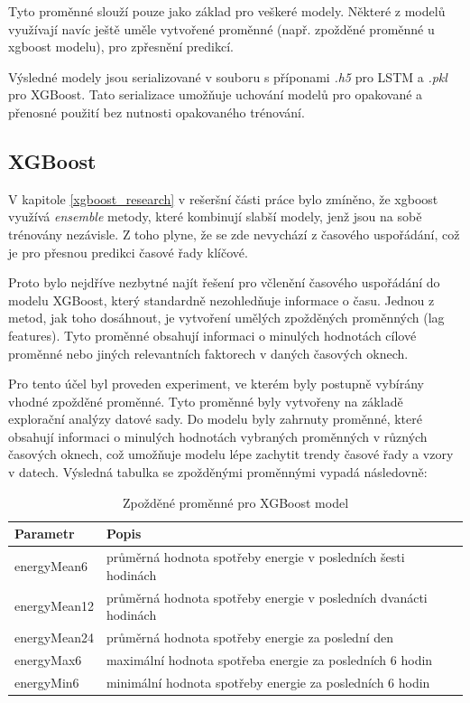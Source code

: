 \documentclass[FM,BP,fonts]{tulthesis}
\begin{document}
Tyto proměnné slouží pouze jako základ pro veškeré modely. Některé z modelů využívají navíc ještě uměle vytvořené proměnné (např. zpožděné proměnné u xgboost modelu), pro zpřesnění predikcí.

Výsledné modely jsou serializované v souboru s příponami \textit{.h5} pro LSTM a \textit{.pkl} pro XGBoost. Tato serializace umožňuje uchování modelů pro opakované a přenosné použití bez nutnosti opakovaného trénování.

\subsection{XGBoost}
V kapitole \ref{xgboost_research} v rešeršní části práce bylo zmíněno, že xgboost využívá \textit{ensemble} metody, které kombinují slabší modely, jenž jsou na sobě trénovány nezávisle. Z toho plyne, že se zde nevychází z časového uspořádání, což je pro přesnou predikci časové řady klíčové.

Proto bylo nejdříve nezbytné najít řešení pro včlenění časového uspořádání do modelu XGBoost, který standardně nezohledňuje informace o času. Jednou z metod, jak toho dosáhnout, je vytvoření umělých zpožděných proměnných (lag features). Tyto proměnné obsahují informaci o minulých hodnotách cílové proměnné nebo jiných relevantních faktorech v daných časových oknech.

Pro tento účel byl proveden experiment, ve kterém byly postupně vybírány vhodné zpožděné proměnné. Tyto proměnné byly vytvořeny na základě explorační analýzy datové sady. Do modelu byly zahrnuty proměnné, které obsahují informaci o minulých hodnotách vybraných proměnných v různých časových oknech, což umožňuje modelu lépe zachytit trendy časové řady a vzory v datech. Výsledná tabulka se zpožděnými proměnnými vypadá následovně: 

\begin{table}[!ht]
	\centering
	\caption{Zpožděné proměnné pro XGBoost model}
	
	\begin{tabularx}{\linewidth}{lX}
		\hline
		\textbf{Parametr} & \textbf{Popis} \\ \hline
		energyMean6 & průměrná hodnota spotřeby energie v posledních šesti hodinách \\
		energyMean12 & průměrná hodnota spotřeby energie v posledních dvanácti hodinách \\
		energyMean24 & průměrná hodnota spotřeby energie za poslední den \\
		energyMax6 & maximální hodnota spotřeba energie za posledních 6 hodin\\
		energyMin6 & minimální hodnota spotřeby energie za posledních 6 hodin\\
	\end{tabularx}
\end{table}
\end{document}
